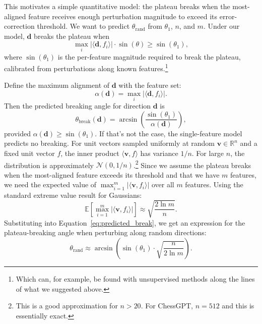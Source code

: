 \documentclass[11pt]{article}
\begin{document}
This motivates a simple quantitative model: the plateau breaks when the most-aligned feature receives enough perturbation magnitude to exceed its error-correction threshold.
We want to predict $\theta_{\mathrm{rand}}$ from $\theta_1$, $n$, and $m$.
Under our model, $\mathbf{d}$ breaks the plateau when
\begin{equation}
    \max_i |\langle \mathbf{d}, f_i \rangle| \cdot \sin(\theta) \geq \sin(\theta_1),
\end{equation}
where $\sin(\theta_1)$ is the per-feature magnitude required to break the plateau, calibrated from perturbations along known features.\footnote{Which can, for example, be found with unsupervised methods along the lines of what we suggested above.}

Define the maximum alignment of $\mathbf{d}$ with the feature set:
\begin{equation}
    \alpha(\mathbf{d}) = \max_i |\langle \mathbf{d}, f_i \rangle|.
\end{equation}
Then the predicted breaking angle for direction $\mathbf{d}$ is
\begin{equation}
    \theta_{\mathrm{break}}(\mathbf{d}) = \arcsin\!\left(\frac{\sin(\theta_1)}{\alpha(\mathbf{d})}\right),
\label{eq:predicted_break}
\end{equation}
provided $\alpha(\mathbf{d}) \geq \sin(\theta_1)$.
If that's not the case, the single-feature model predicts no breaking.
For unit vectors sampled uniformly at random $\mathbf{v} \in \mathbb{R}^n$ and a fixed unit vector $f$, the inner product $\langle \mathbf{v}, f \rangle$ has variance $1/n$.
For large $n$, the distribution is approximately $\mathcal{N}(0, 1/n)$.\footnote{This is a good approximation for $n>20$. For ChessGPT, $n=512$ and this is essentially exact.}
Since we assume the plateau breaks when the most-aligned feature exceeds its threshold and that we have $m$ features, we need the expected value of $\max_{i=1}^{m} |\langle \mathbf{v}, f_i \rangle|$ over all $m$ features.
Using the standard extreme value result for Gaussians:
\begin{equation}
    \mathbb{E}\!\left[\max_{i=1}^{m} |\langle \mathbf{v}, f_i \rangle|\right] \approx \sqrt{\frac{2 \ln m}{n}}.
\end{equation}
Substituting into Equation~\eqref{eq:predicted_break}, we get an expression for the plateau-breaking angle when perturbing along random directions:
\begin{equation}
    \theta_{\mathrm{rand}} \approx \arcsin\!\left(\sin(\theta_1) \cdot \sqrt{\frac{n}{2 \ln m}}\right).
\label{eq:plateau_breaking_rand}
\end{equation}
\end{document}
